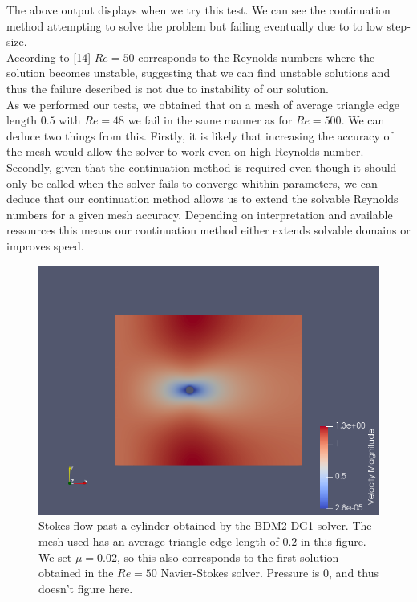 \documentclass[11pt,twoside,a4paper]{article}
\begin{document}
The above output displays when we try this test. We can see the continuation method attempting to solve the problem but failing eventually due to to low step-size.\\
According to [14] $Re = 50$ corresponds to the Reynolds numbers where the solution becomes unstable, suggesting that we can find unstable solutions and thus the failure described is not due to instability of our solution.\\
As we performed our tests, we obtained that on a mesh of average triangle edge length $0.5$ with $Re = 48$ we fail in the same manner as for $Re = 500$. We can deduce two things from this. Firstly, it is likely that increasing the accuracy of the mesh would allow the solver to work even on high Reynolds number. Secondly, given that the continuation method is required even though it should only be called when the solver fails to converge whithin parameters, we can deduce that our continuation method allows us to extend the solvable Reynolds numbers for a given mesh accuracy. Depending on interpretation and available ressources this means our continuation method either extends solvable domains or improves speed.

\begin{figure}
  \includegraphics[width=\linewidth]{scR50.png}
  \caption{Stokes flow past a cylinder obtained by the BDM2-DG1 solver. The mesh used has an average triangle edge length of $0.2$ in this figure. We set $\mu = 0.02$, so this also corresponds to the first solution obtained in the $Re =50$ Navier-Stokes solver. Pressure is $0$, and thus doesn't figure here.}
\end{figure}
\end{document}
